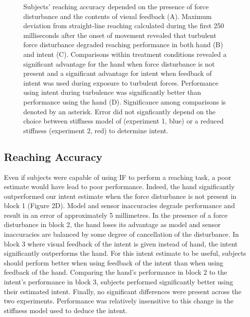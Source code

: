 \documentclass{frontiersSCNS} %
\begin{document}
\begin{figure}[t]
\centering
{}
\caption{Subjects' reaching accuracy depended on the presence of force disturbance and the contents of visual feedback (A). Maximum deviation from straight-line reaching calculated during the first 250 milliseconds after the onset of movement revealed that turbulent force disturbance degraded reaching performance in both hand (B) and intent (C). Comparisons within treatment conditions revealed a significant advantage for the hand when force disturbance is not present and a significant advantage for intent when feedback of intent was used during exposure to turbulent forces. Performance using intent during turbulence was significantly better than performance using the hand (D). Significance among comparisons is denoted by an asterisk. Error did not signficantly depend on the choice between stiffness model of \cite{shadmehr1994adaptive} (experiment 1, blue) or a reduced stiffness (experiment 2, red) to determine intent.}
\label{error}
\end{figure}

\subsection*{Reaching Accuracy}
Even if subjects were capable of using IF to perform a reaching task, a poor estimate would have lead to poor performance. Indeed, the hand significantly outperformed our intent estimate when the force disturbance is not present in block 1 (Figure 2D). Model and sensor inaccuracies degrade performance and result in an error of approximately 5 millimetres. In the presence of a force disturbance in block 2, the hand loses its advantage as model and sensor inaccuracies are balanced by some degree of cancellation of the disturbance. In block 3 where visual feedback of the intent is given instead of hand, the intent significantly outperforms the hand. For this intent estimate to be useful, subjects should perform better when using feedback of the intent than when using feedback of the hand. Comparing the hand's performance in block 2 to the intent's performance in block 3, subjects performed significantly better using their estimated intent. Finally, no significant differences were present across the two experiments. Performance was relatively insensitive to this change in the stiffness model used to deduce the intent.
\end{document}
